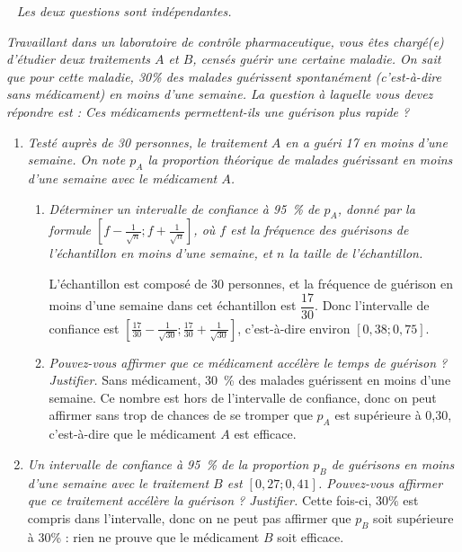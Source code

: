 \documentclass[12pt]{article}
\begin{document}
\begin{exercice}[Échantillonnage]~
  \noindent\emph{Les deux questions sont indépendantes.}

  \emph{Travaillant dans un laboratoire de contrôle pharmaceutique, vous êtes chargé(e) d'étudier deux traitements $A$ et $B$, censés guérir une certaine maladie. On sait que pour cette maladie, 30\% des malades guérissent spontanément (c'est-à-dire sans médicament) en moins d'une semaine. La question à laquelle vous devez répondre est : Ces médicaments permettent-ils une guérison plus rapide ?}

  \begin{enumerate}
    \item \emph{Testé auprès de 30 personnes, le traitement $A$ en a guéri 17 en moins d'une semaine. On note $p_A$ la proportion théorique de malades guérissant en moins d'une semaine avec le médicament $A$.}
      \begin{enumerate}
        \item \emph{Déterminer un intervalle de confiance à 95~\% de $p_A$, donné par la formule $\left[f-\frac{1}{\sqrt{n}};f+\frac{1}{\sqrt{n}}\right]$, où $f$ est la fréquence des guérisons de l'échantillon en moins d'une semaine, et $n$ la taille de l'échantillon.}

          L'échantillon est composé de 30 personnes, et la fréquence de guérison en moins d'une semaine dans cet échantillon est $\dfrac{17}{30}$. Donc l'intervalle de confiance est $\left[ \frac{17}{30}-\frac{1}{\sqrt{30}};\frac{17}{30}+\frac{1}{\sqrt{30}}  \right]$, c'est-à-dire environ $\left[ 0,38;0,75 \right]$.
        \item \emph{Pouvez-vous affirmer que ce médicament accélère le temps de guérison ? Justifier.} Sans médicament, 30~\% des malades guérissent en moins d'une semaine. Ce nombre est hors de l'intervalle de confiance, donc on peut affirmer sans trop de chances de se tromper que $p_A$ est supérieure à 0,30, c'est-à-dire que le médicament $A$ est efficace.
      \end{enumerate}
    \item \emph{Un intervalle de confiance à 95~\% de la proportion $p_B$ de guérisons en moins d'une semaine avec le traitement $B$ est $\left[0,27;0,41\right]$. Pouvez-vous affirmer que ce traitement accélère la guérison ? Justifier.}
      Cette fois-ci, $30\%$ est compris dans l'intervalle, donc on ne peut pas affirmer que $p_B$ soit supérieure à 30\% : rien ne prouve que le médicament $B$ soit efficace.
  \end{enumerate}
\end{exercice}
\end{document}
